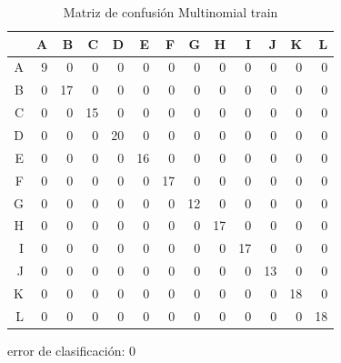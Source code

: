 \documentclass[pdf]{beamer}
\begin{document}
\begin{frame}
\begin{table}[ht]
\begin{adjustbox}{width= 3.5in,center}
\centering
\begin{tabular}{rrrrrrrrrrrrr}
  \hline
 & A & B & C & D & E & F & G & H & I & J & K & L \\ 
  \hline
A &   9 &   0 &   0 &   0 &   0 &   0 &   0 &   0 &   0 &   0 &   0 &   0 \\ 
  B &   0 &  17 &   0 &   0 &   0 &   0 &   0 &   0 &   0 &   0 &   0 &   0 \\ 
  C &   0 &   0 &  15 &   0 &   0 &   0 &   0 &   0 &   0 &   0 &   0 &   0 \\ 
  D &   0 &   0 &   0 &  20 &   0 &   0 &   0 &   0 &   0 &   0 &   0 &   0 \\ 
  E &   0 &   0 &   0 &   0 &  16 &   0 &   0 &   0 &   0 &   0 &   0 &   0 \\ 
  F &   0 &   0 &   0 &   0 &   0 &  17 &   0 &   0 &   0 &   0 &   0 &   0 \\ 
  G &   0 &   0 &   0 &   0 &   0 &   0 &  12 &   0 &   0 &   0 &   0 &   0 \\ 
  H &   0 &   0 &   0 &   0 &   0 &   0 &   0 &  17 &   0 &   0 &   0 &   0 \\ 
  I &   0 &   0 &   0 &   0 &   0 &   0 &   0 &   0 &  17 &   0 &   0 &   0 \\ 
  J &   0 &   0 &   0 &   0 &   0 &   0 &   0 &   0 &   0 &  13 &   0 &   0 \\ 
  K &   0 &   0 &   0 &   0 &   0 &   0 &   0 &   0 &   0 &   0 &  18 &   0 \\ 
  L &   0 &   0 &   0 &   0 &   0 &   0 &   0 &   0 &   0 &   0 &   0 &  18 \\ 
   \hline
\end{tabular}
\end{adjustbox}
	\label{tabla:confusionMLtrain}
	\caption{Matriz de confusión Multinomial train}
\end{table}

error de clasificación: 0
\end{frame}
\end{document}
